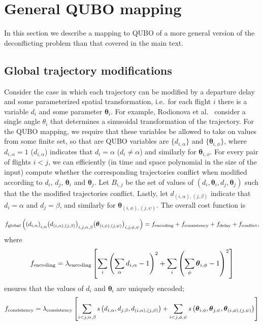 \section{General QUBO mapping}
In this section we describe a mapping to QUBO of a more general version of the deconflicting problem than that covered in the main text.

\subsection{Global trajectory modifications}
Consider the case in which each trajectory can be modified by a departure delay and some parameterized spatial transformation, i.e.\ for each flight $i$ there is a variable $d_i$ and some parameter $\boldsymbol \theta_i$.
For example, Rodionova et al.~\cite{rodionova16} consider a single angle $\theta_i$ that determines a sinusoidal transformation of the trajectory.
For the QUBO mapping, we require that these variables be allowed to take on values from some finite set, so that are QUBO variables are $\{d_{i, \alpha}\}$ and $\{\boldsymbol \theta_{i,\phi}\}$, where $d_{i, \alpha} = 1$ ($d_{i, \alpha}$) indicates that $d_i = \alpha$ ($d_i \neq \alpha$) and similarly for $\boldsymbol \theta_{i, \phi}$.
For every pair of flights $i < j$, we can efficiently (in time and space polynomial in the size of the input) compute whether the corresponding trajectories conflict when modified according to $d_i$, $d_j$, $\boldsymbol \theta_i$ and $\boldsymbol \theta_j$.
Let $B_{i, j}$ be the set of values of $(d_i, \boldsymbol \theta_i, d_j, \boldsymbol \theta_j)$ such that the the modified trajectories conflict.
Lastly, let $d_{(i, \alpha), (j, \beta)}$ indicate that $d_i = \alpha$ and $ d_j = \beta$, and similarly for $\boldsymbol \theta_{(i, \phi), (j, \psi)}$.
The overall cost function is
\begin{widetext}
\begin{equation}
f_{\mathrm{global}}
\left(
{\left(d_{i,\alpha}\right)}_{i,\alpha}
{\left(d_{(i,\alpha),(j,\beta)}\right)}_{i,j,\alpha,\beta}
{\left(\boldsymbol \theta_{(i,\phi),(j,\psi)}\right)}_{i,j,\phi,\psi}
\right)
=
f_{\mathrm{encoding}} +
f_{\mathrm{consistency}} +
f_{\mathrm{delay}} +
f_{\mathrm{conflict}},
\end{equation}
where 
\begin{equation}
  f_{\mathrm{encoding}}
  =
  \lambda_{\mathrm{encoding}}
  \left[
  \sum_{i} {\left(\sum_{\alpha} d_{i, \alpha} -1\right)}^2
  +
  \sum_{i} {\left(\sum_{\phi} \boldsymbol \theta_{i, \phi} -1\right)}^2
\right]
\end{equation}
ensures that the values of $d_i$ and $\boldsymbol \theta_i$ are uniquely encoded;
\begin{equation}
f_{\mathrm{consistency}}
=
\lambda_{\mathrm{consistency}}
\left[
\sum_{i < j,\alpha, \beta} 
s\left(d_{i,\alpha}, d_{j, \beta}, d_{(i, \alpha), (j, \beta)}\right)
+
\sum_{i < j,\phi, \psi} 
s\left(\boldsymbol \theta_{i,\phi}, \boldsymbol \theta_{j, \psi}, \boldsymbol \theta_{(i, \phi), (j, \psi)}\right)
\right]
\end{equation}
\end{widetext}
